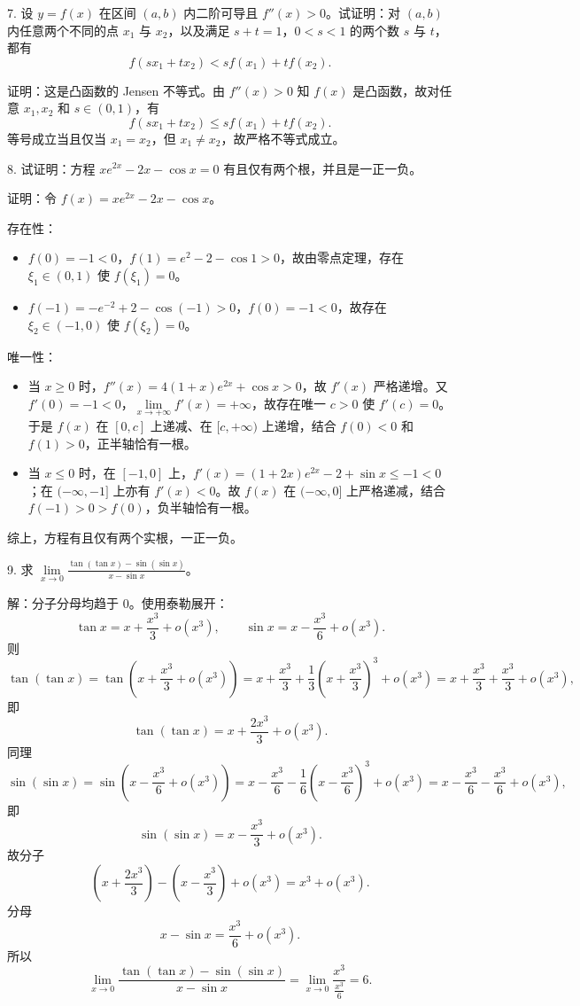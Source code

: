 7. 设 \(y=f(x)\) 在区间 \((a,b)\) 内二阶可导且 \(f''(x)>0\)。试证明：对 \((a,b)\) 内任意两个不同的点 \(x_1\) 与 \(x_2\)，以及满足 \(s+t=1\)，\(0<s<1\) 的两个数 \(s\) 与 \(t\)，都有
\[ f(sx_1+tx_2)<sf(x_1)+tf(x_2). \]

证明：这是凸函数的 Jensen 不等式。由 \(f''(x)>0\) 知 \(f(x)\) 是凸函数，故对任意 \(x_1,x_2\) 和 \(s\in(0,1)\)，有
\[ f(sx_1+tx_2)\le sf(x_1)+tf(x_2). \]
等号成立当且仅当 \(x_1=x_2\)，但 \(x_1\neq x_2\)，故严格不等式成立。

8. 试证明：方程 \(xe^{2x}-2x-\cos x=0\) 有且仅有两个根，并且是一正一负。

证明：令 \(f(x)=xe^{2x}-2x-\cos x\)。

存在性：

\begin{itemize}
\item \(f(0)=-1<0\)，\(f(1)=e^{2}-2-\cos 1>0\)，故由零点定理，存在 \(\xi_1\in(0,1)\) 使 \(f(\xi_1)=0\)。
\item \(f(-1)=-e^{-2}+2-\cos(-1)>0\)，\(f(0)=-1<0\)，故存在 \(\xi_2\in(-1,0)\) 使 \(f(\xi_2)=0\)。
\end{itemize}

唯一性：

\begin{itemize}
\item 当 \(x\ge 0\) 时，\(f''(x)=4(1+x)e^{2x}+\cos x>0\)，故 \(f'(x)\) 严格递增。又 \(f'(0)=-1<0\)，\(\lim\limits_{x\to+\infty}f'(x)=+\infty\)，故存在唯一 \(c>0\) 使 \(f'(c)=0\)。于是 \(f(x)\) 在 \([0,c]\) 上递减、在 \([c,+\infty)\) 上递增，结合 \(f(0)<0\) 和 \(f(1)>0\)，正半轴恰有一根。
\item 当 \(x\le 0\) 时，在 \([-1,0]\) 上，\(f'(x)=(1+2x)e^{2x}-2+\sin x\le -1<0\)；在 \((-\infty,-1]\) 上亦有 \(f'(x)<0\)。故 \(f(x)\) 在 \((-\infty,0]\) 上严格递减，结合 \(f(-1)>0>f(0)\)，负半轴恰有一根。
\end{itemize}

综上，方程有且仅有两个实根，一正一负。

9. 求 \(\lim\limits_{x\to 0}\frac{\tan(\tan x)-\sin(\sin x)}{x-\sin x}\)。

解：分子分母均趋于 \(0\)。使用泰勒展开：
\[ \tan x=x+\frac{x^{3}}{3}+o(x^{3}),\qquad \sin x=x-\frac{x^{3}}{6}+o(x^{3}). \]
则
\[ \tan(\tan x)=\tan\left(x+\frac{x^{3}}{3}+o(x^{3})\right)=x+\frac{x^{3}}{3}+\frac{1}{3}\left(x+\frac{x^{3}}{3}\right)^{3}+o(x^{3})=x+\frac{x^{3}}{3}+\frac{x^{3}}{3}+o(x^{3}), \]
即
\[ \tan(\tan x)=x+\frac{2x^{3}}{3}+o(x^{3}). \]
同理
\[ \sin(\sin x)=\sin\left(x-\frac{x^{3}}{6}+o(x^{3})\right)=x-\frac{x^{3}}{6}-\frac{1}{6}\left(x-\frac{x^{3}}{6}\right)^{3}+o(x^{3})=x-\frac{x^{3}}{6}-\frac{x^{3}}{6}+o(x^{3}), \]
即
\[ \sin(\sin x)=x-\frac{x^{3}}{3}+o(x^{3}). \]
故分子
\[ \left(x+\frac{2x^{3}}{3}\right)-\left(x-\frac{x^{3}}{3}\right)+o(x^{3})=x^{3}+o(x^{3}). \]
分母
\[ x-\sin x=\frac{x^{3}}{6}+o(x^{3}). \]
所以
\[ \lim_{x\to 0}\frac{\tan(\tan x)-\sin(\sin x)}{x-\sin x}=\lim_{x\to 0}\frac{x^{3}}{\frac{x^{3}}{6}}=6. \]

